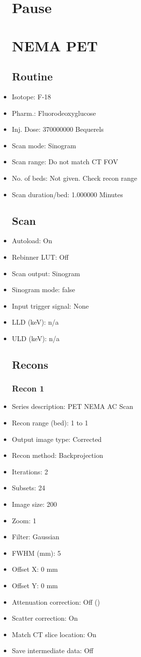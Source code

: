 \documentclass[12pt]{article}
\begin{document}
\begin{itemize}
\section{Pause}
\section{NEMA PET}\subsection{Routine}
\item Isotope: F-18
\item Pharm.: Fluorodeoxyglucose
\item Inj. Dose: 370000000 Bequerels
\item Scan mode: Sinogram
\item Scan range: Do not match CT FOV
\item No. of beds: Not given. Check recon range
\item Scan duration/bed: 1.000000 Minutes
\subsection{Scan}
\item Autoload: On
\item Rebinner LUT: Off
\item Scan output: Sinogram
\item Sinogram mode: false
\item Input trigger signal: None
\item LLD (keV): n/a
\item ULD (keV): n/a
\subsection{Recons}
\subsubsection{Recon 1}
\item Series description: PET NEMA AC Scan
\item Recon range (bed): 1 to 1
\item Output image type: Corrected
\item Recon method: Backprojection
\item Iterations: 2
\item Subsets: 24
\item Image size: 200
\item Zoom: 1
\item Filter: Gaussian
\item FWHM (mm): 5
\item Offset X: 0 mm
\item Offset Y: 0 mm
\item Attenuation correction: Off ()
\item Scatter correction: On
\item Match CT slice location: On
\item Save intermediate data: Off
\end{itemize}
\end{document}
